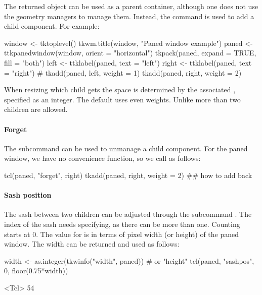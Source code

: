 The returned object can be used as a parent container, although one
does not use the geometry managers to manage them. Instead, the
 command is used to add a child component. For example:
\begin{Schunk}
\begin{Sinput}
 window <- tktoplevel()
 tkwm.title(window, "Paned window example")
 paned <- ttkpanedwindow(window, orient = "horizontal")
 tkpack(paned, expand = TRUE, fill = "both")
 left <- ttklabel(paned, text = "left")
 right <- ttklabel(paned, text = "right")
 #
 tkadd(paned, left, weight = 1)
 tkadd(paned, right, weight = 2)
\end{Sinput}
\end{Schunk}
%
When resizing which child gets the space is determined by the
associated , specified as an integer. The default uses
even weights.  Unlike \GTK\/ more than two children are allowed.

\paragraph{Forget}
The subcommand  can be used to
unmanage a child component. For the paned window, we have no
convenience function, so we call as follows:
\begin{Schunk}
\begin{Sinput}
 tcl(paned, "forget", right)
 tkadd(paned, right, weight = 2) ## how to add back
\end{Sinput}
\end{Schunk}
%
\paragraph{Sash position}
The sash between two children can be adjusted through the subcommand
. The index of the sash needs
specifying, as there can be more than one. Counting starts at 0. The
value for  is in terms of pixel width (or height) of the
paned window. The width can be returned and used as follows:
\begin{Schunk}
\begin{Sinput}
 width <- as.integer(tkwinfo("width", paned))  # or "height"
 tcl(paned, "sashpos", 0, floor(0.75*width))
\end{Sinput}
\begin{Soutput}
<Tcl> 54 
\end{Soutput}
\end{Schunk}
%

